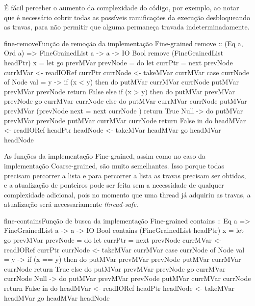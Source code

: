 \documentclass[a4paper,12pt,oldfontcommands]{abntex2}
\begin{document}
É fácil perceber o aumento da complexidade do código, por exemplo, ao notar que é necessário cobrir todas as possíveis ramificações da execução desbloqueando as travas, para não permitir que alguma permaneça travada indeterminadamente.

\begin{code}{fine-remove}{Função de remoção da implementação Fine-grained}
remove :: (Eq a, Ord a) => FineGrainedList a -> a -> IO Bool
remove (FineGrainedList headPtr) x =
    let
        go prevMVar prevNode = do
            let currPtr = next prevNode
            currMVar <- readIORef currPtr
            currNode <- takeMVar currMVar
            case currNode of
                Node { val = y } ->
                    if (x < y) then do
                        putMVar currMVar currNode
                        putMVar prevMVar prevNode
                        return False
                    else if (x > y) then do
                        putMVar prevMVar prevNode
                        go currMVar currNode
                    else do
                        putMVar currMVar currNode
                        putMVar prevMVar (prevNode { next = next currNode })
                        return True
                Null -> do
                    putMVar prevMVar prevNode
                    putMVar currMVar currNode
                    return False
    in do
        headMVar <- readIORef headPtr
        headNode <- takeMVar headMVar
        go headMVar headNode
\end{code}

As funções da implementação Fine-grained, assim como no caso da implementação Coarse-grained, são muito semelhantes. Isso porque todas precisam percorrer a lista e para percorrer a lista as travas precisam ser obtidas, e a atualização de ponteiros pode ser feita sem a necessidade de qualquer complexidade adicional, pois no momento que uma thread já adquiriu as travas, a atualização será necessariamente \textit{thread-safe}.

\begin{code}{fine-contains}{Função de busca da implementação Fine-grained}
contains :: Eq a => FineGrainedList a -> a -> IO Bool
contains (FineGrainedList headPtr) x =
    let
        go prevMVar prevNode = do
            let currPtr = next prevNode
            currMVar <- readIORef currPtr
            currNode <- takeMVar currMVar
            case currNode of
                Node { val = y } ->
                    if (x == y)
                    then do
                        putMVar prevMVar prevNode
                        putMVar currMVar currNode
                        return True
                    else do
                        putMVar prevMVar prevNode
                        go currMVar currNode
                Null -> do
                    putMVar prevMVar prevNode
                    putMVar currMVar currNode
                    return False
    in do
        headMVar <- readIORef headPtr
        headNode <- takeMVar headMVar
        go headMVar headNode
\end{code}
\end{document}
